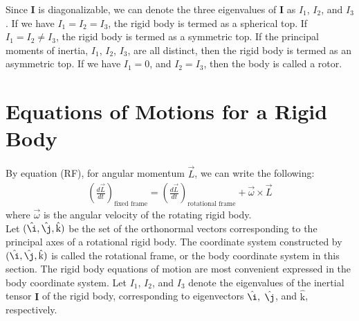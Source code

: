 \documentclass[11pt,oneside]{book}
\theoremstyle{break}
\theoremstyle{break}
\newcommand{\khat}{\hat{\text{k}}}
\newcommand{\ihat}{\hat{\i}}
\newcommand{\jhat}{\hat{\j}}
\begin{document}
Since $\mathbf{I}$ is diagonalizable, we can denote the three eigenvalues of $\mathbf{I}$ as $I_1$, $I_2$, and $I_3$. If we have $I_1 = I_2 = I_3$, the rigid body is termed as a spherical top. If $I_1 = I_2 \neq I_3$, the rigid body is termed as a symmetric top. If the principal moments of inertia, $I_1$, $I_2$, $I_3$, are all distinct, then the rigid body is termed as an asymmetric top. If we have $I_1 = 0$, and $I_2 = I_3$, then the body is called a rotor. 

\newpage
\section[Equations of Motions for a Rigid Body]{\color{red}Equations of Motions for a Rigid Body\color{black}}

By equation (RF), for angular momentum $\vec{L}$, we can write the following:
\begin{align*}
\left(\frac{d\vec{L}}{dt}\right)_{\text{fixed frame}}  = \left(\frac{d\vec{L}}{dt}\right)_{\text{rotational frame}}+ \vec{\omega}\times \vec{L} \tag{RFL}
\end{align*}
where $\vec{\omega}$ is the angular velocity of the rotating rigid body.\\

Let $(\ihat, \jhat, \hat{\text{k}})$ be the set of the orthonormal vectors corresponding to the principal axes of a rotational rigid body. The coordinate system constructed by $(\ihat, \jhat, \hat{\text{k}})$ is called the rotational frame, or the body coordinate system in this section. The rigid body equations of motion are most convenient expressed in the body coordinate system. Let $I_1$, $I_2$, and $I_3$ denote the eigenvalues of the inertial tensor $\mathbf{I}$ of the rigid body, corresponding to eigenvectors $\ihat,$ $\jhat$, and $\khat$, respectively. \\
\end{document}
